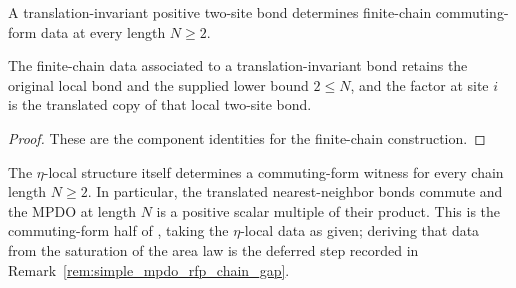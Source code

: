 \begin{definition}
    \label{def:mpdo_translation_invariant_bond_to_commuting_form_data}
    \leanok
    A translation-invariant positive two-site bond determines finite-chain
    commuting-form data at every length $N \ge 2$.
\end{definition}

\begin{theorem}
    \label{thm:mpdo_translation_invariant_bond_to_commuting_form_data_components}
    \leanok
    The finite-chain data associated to a translation-invariant bond retains
    the original local bond and the supplied lower bound $2 \le N$, and the
    factor at site $i$ is the translated copy of that local two-site bond.
\end{theorem}

\begin{proof}\leanok
    These are the component identities for the finite-chain construction.
\end{proof}

\begin{theorem}
    \label{thm:mpdo_eta_local_structure_has_commuting_form}
    \leanok
    The $\eta$-local structure itself determines a commuting-form witness for every
    chain length $N \ge 2$. In particular, the translated nearest-neighbor
    bonds commute and the MPDO at length $N$ is a positive scalar multiple of
    their product. This is the commuting-form half of
    \cite[Proposition~C.8]{Cirac2016MPDO_arXiv}, taking the $\eta$-local data as
    given; deriving that data from the saturation of the area law is the
    deferred step recorded in Remark~\ref{rem:simple_mpdo_rfp_chain_gap}.
\end{theorem}

